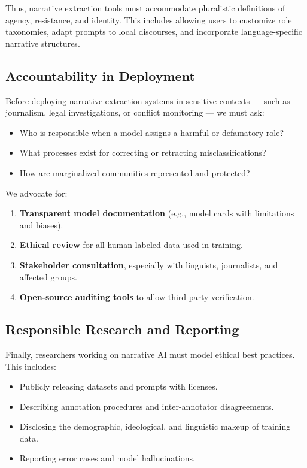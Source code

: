 \documentclass[12pt]{article}
\begin{document}
Thus, narrative extraction tools must accommodate pluralistic definitions of agency, resistance, and identity. This includes allowing users to customize role taxonomies, adapt prompts to local discourses, and incorporate language-specific narrative structures.

\subsection{Accountability in Deployment}

Before deploying narrative extraction systems in sensitive contexts — such as journalism, legal investigations, or conflict monitoring — we must ask:
\begin{itemize}
    \item Who is responsible when a model assigns a harmful or defamatory role?
    \item What processes exist for correcting or retracting misclassifications?
    \item How are marginalized communities represented and protected?
\end{itemize}

We advocate for:
\begin{enumerate}
    \item \textbf{Transparent model documentation} (e.g., model cards with limitations and biases).
    \item \textbf{Ethical review} for all human-labeled data used in training.
    \item \textbf{Stakeholder consultation}, especially with linguists, journalists, and affected groups.
    \item \textbf{Open-source auditing tools} to allow third-party verification.
\end{enumerate}

\subsection{Responsible Research and Reporting}

Finally, researchers working on narrative AI must model ethical best practices. This includes:
\begin{itemize}
    \item Publicly releasing datasets and prompts with licenses.
    \item Describing annotation procedures and inter-annotator disagreements.
    \item Disclosing the demographic, ideological, and linguistic makeup of training data.
    \item Reporting error cases and model hallucinations.
\end{itemize}
\end{document}
